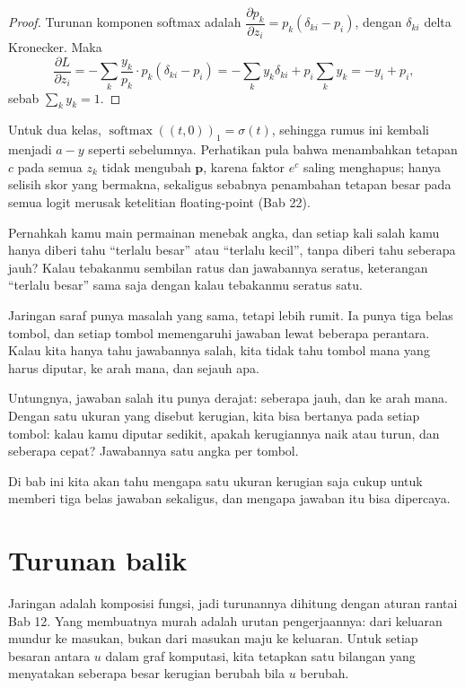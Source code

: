 \begin{proof}
Turunan komponen softmax adalah
$\dfrac{\partial p_{k}}{\partial z_{i}}=p_{k}(\delta_{ki}-p_{i})$, dengan $\delta_{ki}$
delta Kronecker. Maka
\[
  \frac{\partial L}{\partial z_{i}}
  =-\sum_{k}\frac{y_{k}}{p_{k}}\cdot p_{k}(\delta_{ki}-p_{i})
  =-\sum_{k}y_{k}\delta_{ki}+p_{i}\sum_{k}y_{k}
  =-y_{i}+p_{i},
\]
sebab $\sum_{k}y_{k}=1$.
\end{proof}

Untuk dua kelas, $\operatorname{softmax}((t,0))_{1}=\sigma(t)$, sehingga rumus ini kembali
menjadi $a-y$ seperti sebelumnya. Perhatikan pula bahwa menambahkan tetapan $c$ pada semua $z_{k}$ tidak mengubah
$\mathbf{p}$, karena faktor $e^{c}$ saling menghapus; hanya selisih skor yang bermakna,
sekaligus sebabnya penambahan tetapan besar pada semua logit merusak ketelitian floating-point
(Bab 22).

\begin{untukanak}
Pernahkah kamu main permainan menebak angka, dan setiap kali salah kamu hanya diberi tahu
``terlalu besar'' atau ``terlalu kecil'', tanpa diberi tahu seberapa jauh? Kalau tebakanmu
sembilan ratus dan jawabannya seratus, keterangan ``terlalu besar'' sama saja dengan kalau
tebakanmu seratus satu.

Jaringan saraf punya masalah yang sama, tetapi lebih rumit. Ia punya tiga belas tombol, dan
setiap tombol memengaruhi jawaban lewat beberapa perantara. Kalau kita hanya tahu jawabannya
salah, kita tidak tahu tombol mana yang harus diputar, ke arah mana, dan sejauh apa.

Untungnya, jawaban salah itu punya derajat: seberapa jauh, dan ke arah mana. Dengan satu ukuran yang disebut kerugian, kita bisa bertanya pada setiap tombol: kalau kamu diputar sedikit, apakah kerugiannya naik atau turun, dan seberapa cepat? Jawabannya satu angka per tombol.

Di bab ini kita akan tahu mengapa satu ukuran kerugian saja cukup untuk memberi tiga belas
jawaban sekaligus, dan mengapa jawaban itu bisa dipercaya.
\end{untukanak}

\section{Turunan balik}

Jaringan adalah komposisi fungsi, jadi turunannya dihitung dengan aturan rantai Bab 12. Yang
membuatnya murah adalah urutan pengerjaannya: dari keluaran mundur ke masukan, bukan dari
masukan maju ke keluaran. Untuk setiap besaran antara $u$ dalam graf komputasi, kita
tetapkan satu bilangan yang menyatakan seberapa besar kerugian berubah bila $u$ berubah.

